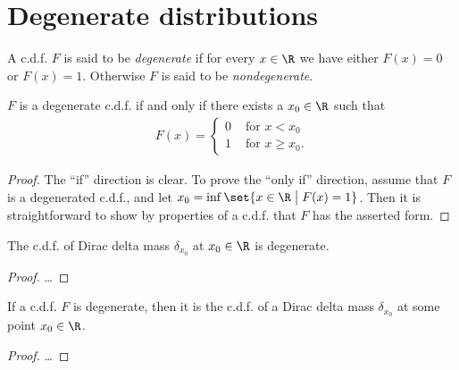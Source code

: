 \section{Degenerate distributions}

\begin{definition}
  \label{def:degenerate-cdf}
  \leanok
  A c.d.f. $F$ is said to be
  \emph{degenerate} if for every $x \in \R$ we have either $F(x) = 0$ or $F(x) = 1$.
  Otherwise $F$ is said to be \emph{nondegenerate}.
\end{definition}

\begin{lemma}
  \label{lem:degenerate-cdf-iff-exists-jump}
  \leanok
  $F$ is a degenerate c.d.f. if and only if there exists a $x_0 \in \R$ such that
  \begin{align*}
  F(x) = \begin{cases}
          0 & \text{ for } x < x_0 \\
          1 & \text{ for } x \ge x_0 .
         \end{cases}
  \end{align*}
\end{lemma}
\begin{proof}
  \uses{}
  \leanok
  The ``if'' direction is clear. To prove the ``only if'' direction, assume that
  $F$ is a degenerated c.d.f., and let $x_0 = \inf \set{ x \in \R \; \big| \; F(x) = 1}$.
  Then it is straightforward to show by properties of a c.d.f. that $F$ has the asserted form.
\end{proof}

\begin{lemma}
  \label{lem:delta-has-degenerate-cdf}
  \leanok
  The c.d.f. of Dirac delta mass $\delta_{x_0}$ at $x_0 \in \R$ is degenerate.
\end{lemma}
\begin{proof}
  \leanok
  \ldots
\end{proof}

\begin{lemma}
  \label{lem:degenerate-cdf-is-delta}
  \leanok
  If a c.d.f. $F$ is degenerate, then it is the c.d.f. of a Dirac delta mass $\delta_{x_0}$
  at some point $x_0 \in \R$.
\end{lemma}
\begin{proof}
  \leanok
  \ldots
\end{proof}

